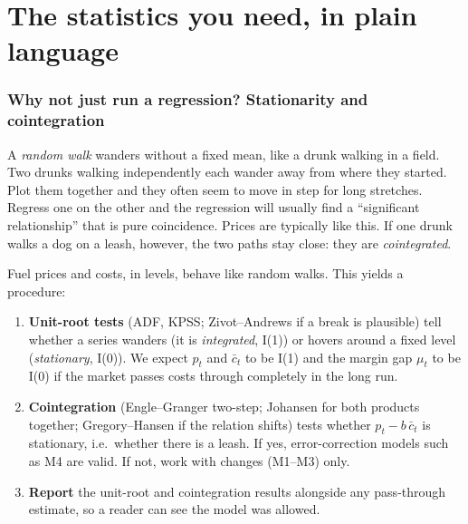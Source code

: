 \documentclass[11pt,a4paper]{article}
\theoremstyle{definition}
\begin{document}
\part{The statistics you need, in plain language}

\section{Why not just run a regression? Stationarity and cointegration}\label{sec:coint}

\begin{intuition}
A \emph{random walk} wanders without a fixed mean, like a drunk walking in a field. Two drunks walking independently each wander away from where they started. Plot them
together and they often seem to move in step for long stretches. Regress one on the other and the regression will usually find a ``significant relationship'' that is pure coincidence.
Prices are typically like this. If one drunk walks a dog on a leash, however, the two paths stay close: they are \emph{cointegrated}.
\end{intuition}

\begin{table}[h]
\centering

\caption{The danger of regressing wandering series on each other. The two series are independent by construction, yet the usual test finds a ``relationship'' most of the time.}
\end{table}

Fuel prices and costs, in levels, behave like random walks. This yields a procedure:

\begin{enumerate}[leftmargin=2em]
\item \textbf{Unit-root tests} (ADF, KPSS; Zivot--Andrews if a break is plausible) tell whether a series wanders (it is \emph{integrated}, I(1)) or hovers around a fixed level (\emph{stationary}, I(0)). We expect $p_t$ and $\bar c_t$ to be I(1)
  and the margin gap $\mu_t$ to be I(0) if the market passes costs through completely in the long run.
\item \textbf{Cointegration} (Engle--Granger two-step; Johansen for both products together; Gregory--Hansen if the relation shifts) tests whether $p_t - b\,\bar c_t$ is stationary, i.e.\ whether there is a leash. If yes, error-correction models such as M4 are valid. If not, work with changes (M1--M3) only.
\item \textbf{Report} the unit-root and cointegration results alongside any pass-through estimate, so a reader can see the model was allowed.
\end{enumerate}
\end{document}
